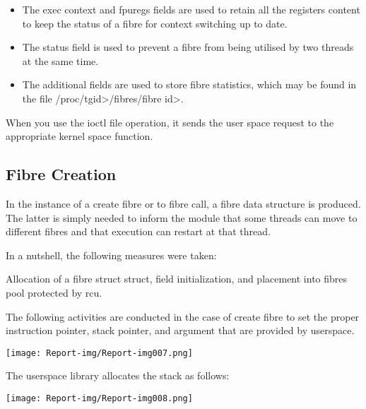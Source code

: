 \bigskip

\begin{itemize}
\item The exec context and fpuregs fields are used to retain all the registers content to keep the status of a fibre for context switching up to date.
\end{itemize}

\bigskip

\begin{itemize}
\item The status field is used to prevent a fibre from being utilised by two threads at the same time.
\end{itemize}

\bigskip

\begin{itemize}
\item The additional fields are used to store fibre statistics, which may be found in the file /proc/tgid{\textgreater}/fibres/fibre id{\textgreater}.
\end{itemize}
When you use the ioctl file operation, it sends the user space request to the appropriate kernel space function.



\subsection{Fibre Creation}
In the instance of a create fibre or to fibre call, a fibre data structure is produced. The latter is simply needed to inform the module that some threads can move to different fibres and that execution can restart at that thread.

In a nutshell, the following measures were taken:

{\textbullet} Allocation of a fibre struct struct, field initialization, and placement into fibres pool protected by rcu.

The following activities are conducted in the case of create fibre to set the proper instruction pointer, stack pointer, and argument that are provided by userspace.

 \texttt{[image: Report-img/Report-img007.png]} 

The userspace library allocates the stack as follows:

 \texttt{[image: Report-img/Report-img008.png]} 

